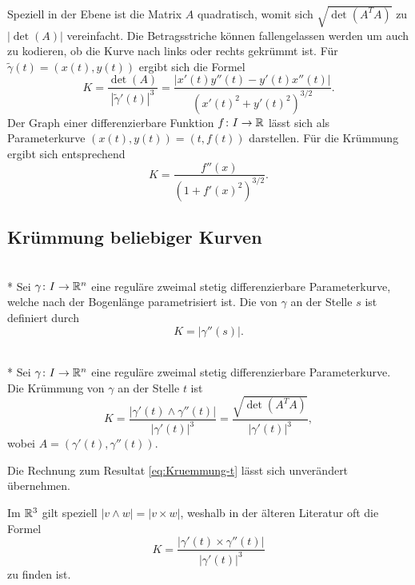 Speziell in der Ebene ist die
Matrix $A$ quadratisch, womit sich $\sqrt{\det(A^T A)}$
zu $|\det(A)|$ vereinfacht. Die Betragsstriche können fallengelassen
werden um auch zu kodieren, ob die Kurve nach links oder rechts
gekrümmt ist. Für $\tilde\gamma(t)=(x(t),y(t))$ ergibt
sich die Formel%
\begin{equation}\label{eq:Kruemmung-t-Ebene}
K = \frac{\det(A)}{|\tilde\gamma'(t)|^3}
= \frac{|x'(t)y''(t)-y'(t)x''(t)|}{(x'(t)^2+y'(t)^2)^{3/2}}.
\end{equation}
Der Graph einer differenzierbare Funktion $f\colon I\to \mathbb R$ lässt sich
als Parameterkurve $(x(t),y(t))=(t,f(t))$ darstellen. Für die
Krümmung ergibt sich entsprechend
\begin{equation}
K = \frac{f''(x)}{(1+f'(x)^2)^{3/2}}.
\end{equation}

\subsection{Krümmung beliebiger Kurven}

\begin{definition}\mbox{}\\*
Sei $\gamma\colon I\to \mathbb R^n$ eine reguläre zweimal stetig
differenzierbare Parameterkurve, welche nach der Bogenlänge
parametrisiert ist. Die  von $\gamma$ an der Stelle
$s$ ist definiert durch%
\begin{equation}
K = |\gamma''(s)|.
\end{equation}
\end{definition}

\begin{theorem}\mbox{}\\*
Sei $\gamma\colon I\to\mathbb R^n$ eine reguläre zweimal stetig
differenzierbare Parameterkurve. Die Krümmung von $\gamma$ an der
Stelle $t$ ist%
\begin{equation}
K = \frac{|\gamma'(t)\wedge\gamma''(t)|}{|\gamma'(t)|^3}
= \frac{\sqrt{\det(A^T A)}}{|\gamma'(t)|^3},
\end{equation}
wobei $A=(\gamma'(t),\gamma''(t))$.
\end{theorem}
 Die Rechnung zum Resultat \eqref{eq:Kruemmung-t}
lässt sich unverändert übernehmen.\;\qedsymbol

Im $\mathbb R^3$ gilt speziell $|v\wedge w| = |v\times w|$,
weshalb in der älteren Literatur oft die Formel%
\begin{equation}
K = \frac{|\gamma'(t)\times\gamma''(t)|}{|\gamma'(t)|^3}
\end{equation}
zu finden ist.

